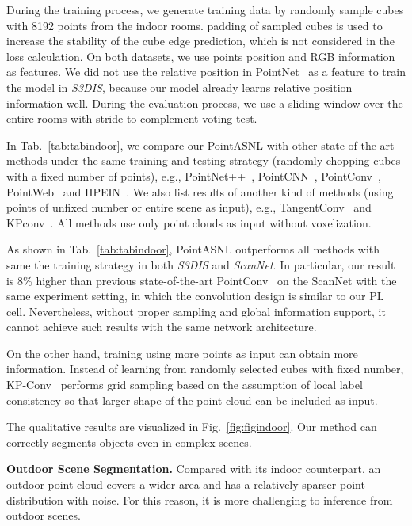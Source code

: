 \documentclass[10pt,twocolumn,letterpaper]{article}
\begin{document}
	During the training process, we generate training data by randomly sample  cubes with 8192 points from the indoor rooms.  padding of sampled cubes is used to increase the stability of the cube edge prediction, which is not considered in the loss calculation. On both datasets, we use points position and RGB information as features. We did not use the relative position in PointNet~\cite{pointnet} as a feature to train the model in \textit{S3DIS}, because our model already learns relative position information well. During the evaluation process, we use a sliding window over the entire rooms with  stride to complement  voting test. 
	
	In Tab.~\ref{tab:tabindoor}, we compare our PointASNL with other state-of-the-art methods under the same training and testing strategy (randomly chopping cubes with a fixed number of points), e.g., PointNet++~\cite{pointnet2}, PointCNN~\cite{PointCNN},  PointConv~\cite{PointConv}, PointWeb~\cite{PointWeb} and HPEIN~\cite{HPEIN}. We also list results of another kind of methods (using points of unfixed number or entire scene as input),  e.g., {TangentConv~\cite{TangentConv}} and {KPconv~\cite{KPCONV}}. All methods use only point clouds as input without voxelization.
	
	
	As shown in Tab.~\ref{tab:tabindoor}, PointASNL outperforms all methods with same the training strategy in both \textit{S3DIS} and \textit{ScanNet}. In particular, our result is 8\% higher than previous state-of-the-art PointConv~\cite{PointConv} on the ScanNet with the same experiment setting, in which the convolution design is similar to our PL cell. Nevertheless, without proper sampling and global information support, it cannot achieve such results with the same network architecture.
	
	On the other hand, training using more points as input can obtain more information. Instead of learning from randomly selected cubes with fixed number,  KP-Conv~\cite{KPCONV} performs grid sampling based on the assumption of local label consistency so that larger shape of the point cloud can be included as input. 
	
	The qualitative results are visualized in Fig.~\ref{fig:figindoor}. Our method can correctly segments objects even in complex scenes.
	
	{\noindent\bf Outdoor Scene Segmentation.} Compared with its indoor counterpart, an outdoor point cloud covers a wider area and has a relatively sparser point distribution with noise. For this reason, it is more challenging to inference from outdoor scenes. 
	
\end{document}
